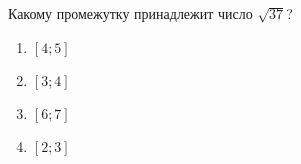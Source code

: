  
\begin{ex}
	Какому промежутку принадлежит число $\sqrt{37}$?
	
	\selectanswer
	\begin{multicols}{4}
		\begin{enumerate}[label=\arabic*)]
			\item $[4;5]$
			\item $[3;4]$
			\item $[6;7]$
			\item $[2;3]$
		\end{enumerate}
	\end{multicols}
\end{ex}